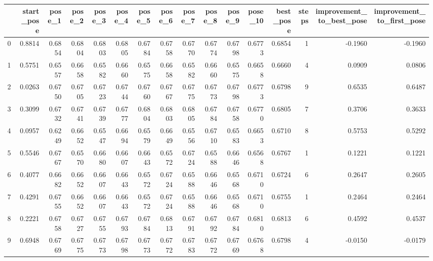 \begin{tabular}{lrrrrrrrrrrrrrrr}
\toprule
{} &  start\_pose &  pose\_1 &  pose\_2 &  pose\_3 &  pose\_4 &  pose\_5 &  pose\_6 &  pose\_7 &  pose\_8 &  pose\_9 &  pose\_10 &  best\_pose &  steps &  improvement\_to\_best\_pose &  improvement\_to\_first\_pose \\
\midrule
0 &      0.8814 &  0.6854 &  0.6804 &  0.6803 &  0.6805 &  0.6784 &  0.6758 &  0.6770 &  0.6774 &  0.6798 &   0.6773 &     0.6854 &      1 &                   -0.1960 &                    -0.1960 \\
1 &      0.5751 &  0.6557 &  0.6658 &  0.6582 &  0.6660 &  0.6575 &  0.6658 &  0.6582 &  0.6660 &  0.6575 &   0.6658 &     0.6660 &      4 &                    0.0909 &                     0.0806 \\
2 &      0.0263 &  0.6750 &  0.6705 &  0.6723 &  0.6744 &  0.6760 &  0.6767 &  0.6775 &  0.6773 &  0.6798 &   0.6773 &     0.6798 &      9 &                    0.6535 &                     0.6487 \\
3 &      0.3099 &  0.6732 &  0.6741 &  0.6739 &  0.6777 &  0.6804 &  0.6803 &  0.6805 &  0.6784 &  0.6758 &   0.6770 &     0.6805 &      7 &                    0.3706 &                     0.3633 \\
4 &      0.0957 &  0.6249 &  0.6652 &  0.6547 &  0.6694 &  0.6579 &  0.6649 &  0.6556 &  0.6710 &  0.6583 &   0.6653 &     0.6710 &      8 &                    0.5753 &                     0.5292 \\
5 &      0.5546 &  0.6767 &  0.6570 &  0.6680 &  0.6607 &  0.6643 &  0.6572 &  0.6724 &  0.6588 &  0.6646 &   0.6568 &     0.6767 &      1 &                    0.1221 &                     0.1221 \\
6 &      0.4077 &  0.6682 &  0.6652 &  0.6607 &  0.6643 &  0.6572 &  0.6724 &  0.6588 &  0.6646 &  0.6568 &   0.6710 &     0.6724 &      6 &                    0.2647 &                     0.2605 \\
7 &      0.4291 &  0.6755 &  0.6652 &  0.6607 &  0.6643 &  0.6572 &  0.6724 &  0.6588 &  0.6646 &  0.6568 &   0.6710 &     0.6755 &      1 &                    0.2464 &                     0.2464 \\
8 &      0.2221 &  0.6758 &  0.6727 &  0.6755 &  0.6793 &  0.6784 &  0.6813 &  0.6791 &  0.6792 &  0.6784 &   0.6810 &     0.6813 &      6 &                    0.4592 &                     0.4537 \\
9 &      0.6948 &  0.6769 &  0.6775 &  0.6773 &  0.6798 &  0.6773 &  0.6772 &  0.6783 &  0.6772 &  0.6769 &   0.6768 &     0.6798 &      4 &                   -0.0150 &                    -0.0179 \\
\bottomrule
\end{tabular}
